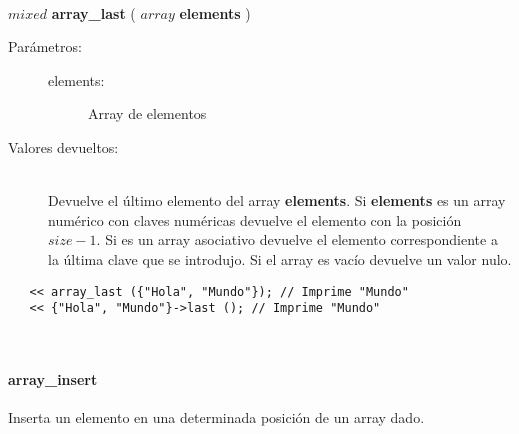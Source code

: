 \hfill \\ $mixed$ \textbf{array\_last} ( $array$ \textbf{elements} )  
\begin{description}
\item [Parámetros:] \hfill 
   \begin{description}
   \item[elements:] Array de elementos
   \end{description}
\item[Valores devueltos:] \hfill \\
   Devuelve el último elemento del array \textbf{elements}. Si \textbf{elements} es un array
   numérico con claves numéricas devuelve el elemento con la posición $size - 1$. Si es un array asociativo 
   devuelve el elemento correspondiente a la última clave que se introdujo. Si el array es vacío 
   devuelve un valor nulo. 
\end{description}
     
\begin{lstlisting}   
   << array_last ({"Hola", "Mundo"}); // Imprime "Mundo"
   << {"Hola", "Mundo"}->last (); // Imprime "Mundo"
\end{lstlisting}
\hfill\\ 

\paragraph{array\_insert}
Inserta un elemento en una determinada posición de un array dado.

